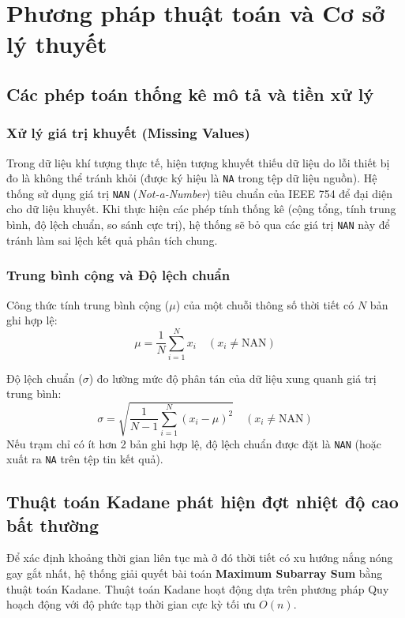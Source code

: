 \section{Phương pháp thuật toán và Cơ sở lý thuyết}

\subsection{Các phép toán thống kê mô tả và tiền xử lý}
\subsubsection{Xử lý giá trị khuyết (Missing Values)}
Trong dữ liệu khí tượng thực tế, hiện tượng khuyết thiếu dữ liệu do lỗi thiết bị đo là không thể tránh khỏi (được ký hiệu là \texttt{NA} trong tệp dữ liệu nguồn). Hệ thống sử dụng giá trị \texttt{NAN} (\textit{Not-a-Number}) tiêu chuẩn của IEEE 754 để đại diện cho dữ liệu khuyết. Khi thực hiện các phép tính thống kê (cộng tổng, tính trung bình, độ lệch chuẩn, so sánh cực trị), hệ thống sẽ bỏ qua các giá trị \texttt{NAN} này để tránh làm sai lệch kết quả phân tích chung.

\subsubsection{Trung bình cộng và Độ lệch chuẩn}
Công thức tính trung bình cộng ($\mu$) của một chuỗi thông số thời tiết có $N$ bản ghi hợp lệ:
\begin{equation}
    \mu = \frac{1}{N} \sum_{i=1}^{N} x_i \quad (x_i \neq \text{NAN})
\end{equation}

Độ lệch chuẩn ($\sigma$) đo lường mức độ phân tán của dữ liệu xung quanh giá trị trung bình:
\begin{equation}
    \sigma = \sqrt{\frac{1}{N-1} \sum_{i=1}^{N} (x_i - \mu)^2} \quad (x_i \neq \text{NAN})
\end{equation}
Nếu trạm chỉ có ít hơn 2 bản ghi hợp lệ, độ lệch chuẩn được đặt là \texttt{NAN} (hoặc xuất ra \texttt{NA} trên tệp tin kết quả).

\subsection{Thuật toán Kadane phát hiện đợt nhiệt độ cao bất thường}
Để xác định khoảng thời gian liên tục mà ở đó thời tiết có xu hướng nắng nóng gay gắt nhất, hệ thống giải quyết bài toán \textbf{Maximum Subarray Sum} bằng thuật toán Kadane.
Thuật toán Kadane hoạt động dựa trên phương pháp Quy hoạch động với độ phức tạp thời gian cực kỳ tối ưu $O(n)$.

